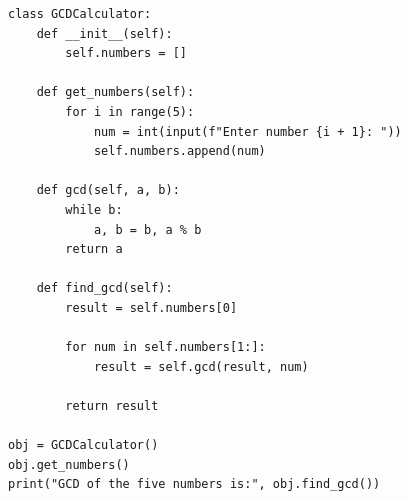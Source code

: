 \begin{verbatim}
class GCDCalculator:
    def __init__(self):
        self.numbers = []

    def get_numbers(self):
        for i in range(5):
            num = int(input(f"Enter number {i + 1}: "))
            self.numbers.append(num)

    def gcd(self, a, b):
        while b:
            a, b = b, a % b
        return a

    def find_gcd(self):
        result = self.numbers[0]

        for num in self.numbers[1:]:
            result = self.gcd(result, num)

        return result

obj = GCDCalculator()
obj.get_numbers()
print("GCD of the five numbers is:", obj.find_gcd())
\end{verbatim}